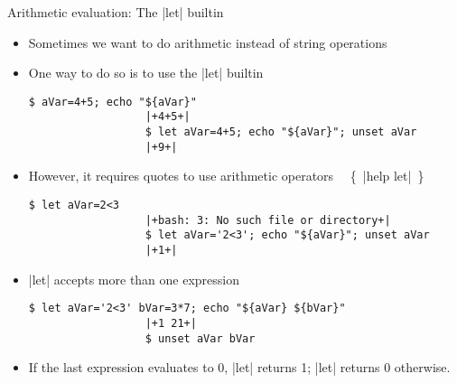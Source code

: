 \begin{frame}[fragile]{Arithmetic evaluation: The \bash|let| builtin}
    \vspace{-4mm}
    \begin{itemize}
        \item Sometimes we want to do arithmetic instead of string operations
        \item One way to do so is to use the \bash|let| builtin
              \begin{lstlisting}[style=MyBash, style=oddnumbers, aboveskip=2mm, belowskip=-6mm]
                  $ aVar=4+5; echo "${aVar}"
                  |+4+5+|
                  $ let aVar=4+5; echo "${aVar}"; unset aVar
                  |+9+|
              \end{lstlisting}
        \item However, it requires quotes to use arithmetic operators $\quad${\tiny\{~\bash|help let|~\}}
              \begin{lstlisting}[style=MyBash, style=oddnumbers, aboveskip=2mm, belowskip=-6mm]
                  $ let aVar=2<3
                  |+bash: 3: No such file or directory+|
                  $ let aVar='2<3'; echo "${aVar}"; unset aVar
                  |+1+|
              \end{lstlisting}
        \item \bash|let| accepts more than one expression
              \begin{lstlisting}[style=MyBash, style=oddnumbers, aboveskip=2mm, belowskip=-6mm]
                  $ let aVar='2<3' bVar=3*7; echo "${aVar} ${bVar}"
                  |+1 21+|
                  $ unset aVar bVar
              \end{lstlisting}
        \item If the last expression evaluates to 0, \bash|let| returns 1; \bash|let| returns 0 otherwise.
    \end{itemize}
\end{frame}

